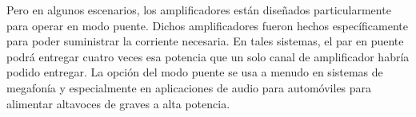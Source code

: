 \documentclass[../main.tex]{subfiles}
\begin{document}
		Pero en algunos escenarios, los amplificadores están diseñados particularmente 
		para operar en modo puente. Dichos amplificadores fueron hechos específicamente 
		para poder suministrar la corriente necesaria. En tales sistemas, el par en puente 
		podrá entregar cuatro veces esa potencia que un solo canal de amplificador habría 
		podido entregar. La opción del modo puente se usa a menudo en sistemas de 
		megafonía y especialmente en aplicaciones de audio para automóviles para alimentar 
		altavoces de graves a alta potencia.
\end{document}
